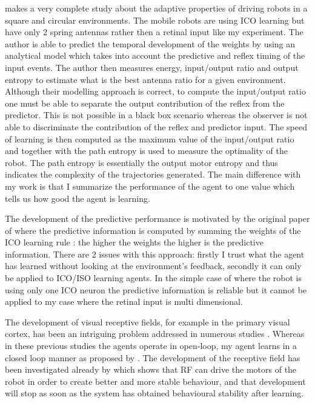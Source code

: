 \citet{Kulvicius2010:infomeasure} makes a very complete study about 
the adaptive properties of driving robots in a square and circular environments.
The mobile robots are using ICO learning but have only
2 spring antennas rather then a retinal input like my experiment.
The author is able to predict the temporal development of the weights by using an analytical 
model which takes into account the predictive and reflex timing of the input events.
The author then measures energy, input/output ratio and output entropy to 
estimate what is the best antenna ratio for a given environment.
Although their modelling approach is correct, to compute the input/output ratio
one must be able to separate the output contribution of the reflex from the
predictor.
This is not possible in a black box scenario whereas the observer is not able
to discriminate the contribution of the reflex and predictor input.
The speed of learning is then computed as the maximum value of the input/output ratio
and together with the path entropy is used to measure the optimality of the robot.
The path entropy is essentially the output motor entropy and thus indicates
the complexity of the trajectories generated.
The main difference with my work is that I summarize the performance 
of the agent to one value which tells us how good the agent is learning.

The development of the predictive performance is motivated by the original 
paper of \citet{Porr2006cf} where the predictive information is
 computed by summing the weights of the ICO learning rule \citep{Porr2003b}:
the higher the weights the higher is the predictive information.
There are 2 issues with this approach:
firstly I trust what the agent has learned without looking at the
 environment's feedback, secondly it can only be applied to ICO/ISO learning agents.
In the simple case of \citet{Porr2006cf} where the robot 
is using only one ICO neuron the predictive information
 is reliable but it cannot be applied to my case where the retinal
 input is multi dimensional.

The development of visual receptive fields, for example in the primary
visual cortex, has been an intriguing problem addressed in numerous
studies
\citep{Olshausen96,Blais98receptivefield,Weber99orientationselective,Hurri03:SimpleCellReceptive,Kording04:HowAreCell,Wyss06:ModelVentralVisual}.
Whereas in these previous studies the agents operate in open-loop, my
agent learns in a closed loop manner as proposed by
\citet{McKinstry06:CerebellarModel}. The development of the receptive field has been
investigated already by \citet{Kulvicius2007:RFrobot,Kulvicius2010:RFinformation}
which shows that RF can drive the motors of the robot in order to
create better and more stable behaviour, and that development will
stop as soon as the system has obtained behavioural stability after
learning.

